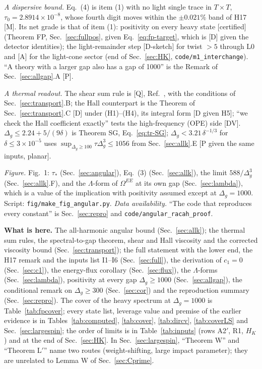 \documentclass[aps,prl,onecolumn,superscriptaddress,nofootinbib]{revtex4-2}
\begin{document}
\emph{A dispersive bound.} Eq.~(4) is item (1) with no light single trace in $T\times T$, $\tau_0=2.8914\times10^{-8}$, whose fourth digit
moves within the $\pm0.021\%$ band of H17 [M]. Its net grade is that of item (1): positivity on every heavy state [certified] (Theorem FP,
Sec.~\ref{sec:fullpos}, given Eq.~\eqref{eq:fp-target}, which is [D] given the detector identities); the light-remainder step [D-sketch] for
twist $>5$ through L0 and [A] for the light-cone sector (end of Sec.~\ref{sec:HK}, \texttt{code/m1\_interchange}). ``A theory with a larger gap
also has a gap of 1000'' is the Remark of Sec.~\ref{sec:allgap}.A [P].

\emph{A thermal readout.} The shear sum rule is [Q], Ref.~\cite{Chowdhury:2016hjy}, with the conditions of Sec.~\ref{sec:transport}.B; the
Hall counterpart is the Theorem of Sec.~\ref{sec:transport}.C [D] under (H1)--(H4), its integral form [D given H5]; ``we check the Hall
coefficient exactly'' tests the high-frequency (OPE) side [DV]. $\Delta_g\le2.24+5/(9\delta)$ is Theorem SG, Eq.~\eqref{eq:tr-SG};
$\Delta_g<3.21\,\delta^{-1/3}$ for $\delta\le3\times10^{-5}$ uses $\sup_{\Delta_g\ge100}\tau\Delta_g^3\le1056$ from Sec.~\ref{sec:allk}.E [P given the
same inputs, planar].

\emph{Figure.} Fig.~1: $\tau_*$ (Sec.~\ref{sec:angular}), Eq.~(3) (Sec.~\ref{sec:allk}), the limit $588/\Delta_g^3$ (Sec.~\ref{sec:allk}.F), and the
$\Lambda$-form of $\Omega^{EE}$ at its own gap (Sec.~\ref{sec:lambda}), which is a value of the implication with positivity assumed except at
$\Delta_g=1000$. Script: \texttt{fig/make\_fig\_angular.py}.
\emph{Data availability.} ``The code that reproduces every constant'' is Sec.~\ref{sec:repro} and \texttt{code/angular\_racah\_proof}.

\textbf{What is here.} The all-harmonic angular bound (Sec.~\ref{sec:allk}); the thermal sum rules, the spectral-to-gap theorem, shear and Hall viscosity and the corrected viscosity bound (Sec.~\ref{sec:transport}); the full statement with the lower end, the H17 remark and the
inputs list I1--I6 (Sec.~\ref{sec:full}), the derivation of $c_1=0$ (Sec.~\ref{sec:c1}), the energy-flux corollary
(Sec.~\ref{sec:flux}), the $\Lambda$-forms (Sec.~\ref{sec:lambda}), positivity at every gap $\Delta_g\ge1000$ (Sec.~\ref{sec:allgap}), the conditional remark on
$\Delta_g\ge300$ (Sec.~\ref{sec:cor}) and the reproduction summary (Sec.~\ref{sec:repro}). The cover of the heavy spectrum at $\Delta_g=1000$ is Table~\ref{tab:fpcover}; every state list, leverage value and premise of the earlier evidence
is in Tables~\ref{tab:computed}, \ref{tab:cover}, \ref{tab:dircv}, \ref{tab:coverLS} and Sec.~\ref{sec:largespin}; the order of limits is in Table~\ref{tab:inputs} (rows A2$'$, R1, $H_K$) and at the end of
Sec.~\ref{sec:HK}. In Sec.~\ref{sec:largespin}, ``Theorem W'' and ``Theorem L$'$'' name two routes (weight-shifting, large impact
parameter); they are unrelated to Lemma W of Sec.~\ref{sec:Cprime}.
\end{document}
